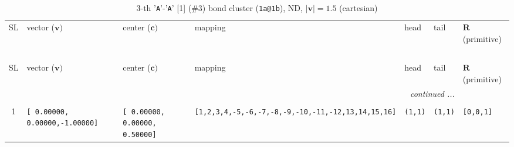 \documentclass[fleqn,10pt,landscape]{jsarticle}
\begin{document}
\renewcommand{\arraystretch}{1.6}
\begin{longtable}[l]{cllllll}
\captionsetup{justification=raggedright, singlelinecheck=off}
\caption{3-th '\texttt{A}'-'\texttt{A}' [1] (\#3) bond cluster (\texttt{1a@1b}), ND, $|\bm{v}|=1.5$ (cartesian)}
 \\
 \hline \hline
SL & vector ($\bm{v})$ & center ($\bm{c})$ & mapping & head & tail & $\bm{R}$ (primitive) \\ \hline \endfirsthead

\multicolumn{6}{l}{\tablename\ \thetable{}} \\
 \hline \hline
SL & vector ($\bm{v})$ & center ($\bm{c})$ & mapping & head & tail & $\bm{R}$ (primitive) \\ \hline \endhead

 \hline \hline
\multicolumn{6}{r}{\footnotesize\it continued ...} \\ \endfoot

 \hline \hline
\multicolumn{6}{r}{} \\ \endlastfoot

1 & \texttt{[ 0.00000, 0.00000,-1.00000]} & \texttt{[ 0.00000, 0.00000, 0.50000]} & \texttt{[1,2,3,4,-5,-6,-7,-8,-9,-10,-11,-12,13,14,15,16]} & \texttt{(1,1)} & \texttt{(1,1)} & \texttt{[0,0,1]} \\
\end{longtable}
\renewcommand{\arraystretch}{1.6}
\end{document}
